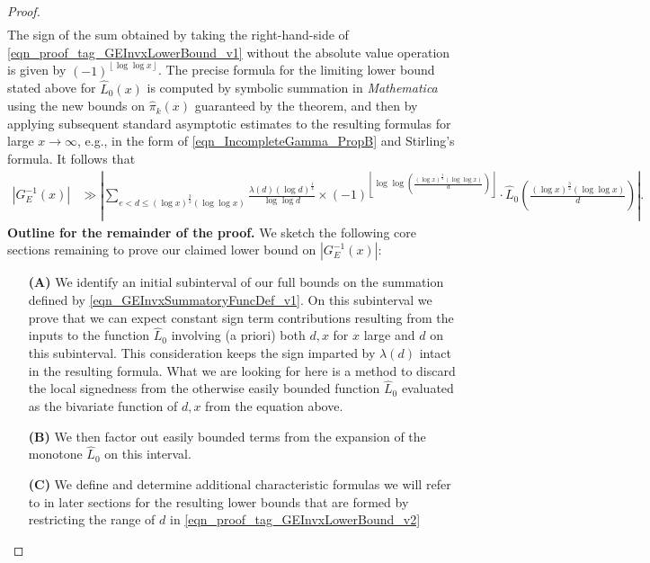 \documentclass[11pt,reqno,a4letter]{article}
\numberwithin{figure}{section}
\numberwithin{table}{section}
\newcommand{\floor}[1]{\left\lfloor #1 \right\rfloor}
\theoremstyle{plain}
\numberwithin{theorem}{section}
\theoremstyle{definition}
\begin{document}
\begin{proof}
\begin{align}
\end{align} 
The sign of the sum obtained by taking the right-hand-side of 
\eqref{eqn_proof_tag_GEInvxLowerBound_v1} without the 
absolute value operation is given by $(-1)^{\floor{\log\log x}}$. 
The precise formula for the 
limiting lower bound stated above for $\widehat{L}_0(x)$ is computed by symbolic summation 
in \emph{Mathematica} using the new bounds on $\widehat{\pi}_k(x)$ guaranteed by 
the theorem, and then by applying subsequent standard asymptotic estimates to the 
resulting formulas for large $x \rightarrow \infty$, e.g., 
in the form of \eqref{eqn_IncompleteGamma_PropB} and Stirling's formula. 
It follows that 
\begin{align} 
\label{eqn_proof_tag_GEInvxLowerBound_v2} 
|G_E^{-1}(x)| & \gg \left\lvert \sum_{e < d \leq (\log x)^{\frac{3}{2}} (\log\log x)} 
     \frac{\lambda(d) (\log d)^{\frac{1}{4}}}{\log\log d} \times 
     (-1)^{\floor{\log\log\left(\frac{(\log x)^{\frac{3}{2}} (\log\log x)}{d}\right)}} \cdot 
     \widehat{L}_0\left(\frac{(\log x)^{\frac{3}{2}} (\log\log x)}{d}\right) \right\rvert. 
\end{align} 
\textbf{Outline for the remainder of the proof.} 
We sketch the following core sections remaining to prove our claimed lower bound on 
$|G_E^{-1}(x)|$: 
\begin{itemize}[itemsep=0pt,topsep=4pt,leftmargin=0.75in] 
\item[\textbf{(A)}] We identify an initial subinterval of our full bounds 
     on the summation defined by 
     \eqref{eqn_GEInvxSummatoryFuncDef_v1}. 
     On this subinterval we prove that we can expect 
     constant sign term contributions resulting from the inputs to the function $\widehat{L}_0$ 
     involving (a priori) both $d,x$ for $x$ large and $d$ on this subinterval. 
     This consideration keeps the sign imparted by $\lambda(d)$ intact 
     in the resulting formula. 
     What we are looking for here is a method to discard the local 
     signedness from the otherwise 
     easily bounded function $\widehat{L}_0$ evaluated as the bivariate 
     function of $d,x$ from the equation above. 
\item[\textbf{(B)}] We then factor out easily bounded terms from the expansion of the 
     monotone $\widehat{L}_0$ on this interval. 
\item[\textbf{(C)}] We define and determine additional characteristic formulas we will 
     refer to in later sections for the resulting lower bounds that are formed by 
     restricting the range of $d$ in 
     \eqref{eqn_proof_tag_GEInvxLowerBound_v2} 

\end{itemize}
\end{proof}
\end{document}
